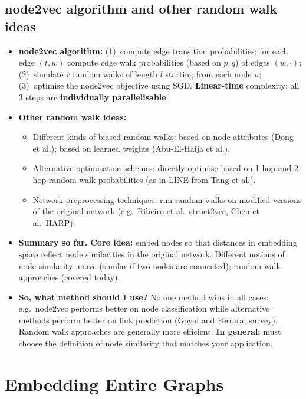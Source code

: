 \subsection{node2vec algorithm and other random walk ideas}\label{sec:lec02-n2v-alg}

\begin{itemize}
  \item \textbf{node2vec algorithm:}
    (1)~compute edge transition probabilities: for each edge $(t,w)$ compute edge
    walk probabilities (based on $p,q$) of edges $(w,\cdot)$;
    (2)~simulate $r$ random walks of length $l$ starting from each node $u$;
    (3)~optimise the node2vec objective using SGD.
    \textbf{Linear-time} complexity; all 3 steps are \textbf{individually
    parallelisable}.
  \item \textbf{Other random walk ideas:}
    \begin{itemize}
      \item Different kinds of biased random walks: based on node attributes
        (Dong et al.); based on learned weights (Abu-El-Haija et al.).
      \item Alternative optimisation schemes: directly optimise based on 1-hop and
        2-hop random walk probabilities (as in LINE from Tang et al.).
      \item Network preprocessing techniques: run random walks on modified
        versions of the original network (e.g.\ Ribeiro et al.\ struct2vec,
        Chen et al.\ HARP).
    \end{itemize}
  \item \textbf{Summary so far.} \textbf{Core idea:} embed nodes so that distances
    in embedding space reflect node similarities in the original network.
    Different notions of node similarity: na\"ive (similar if two nodes are
    connected); random walk approaches (covered today).
  \item \textbf{So, what method should I use?} No one method wins in all cases;
    e.g.\ node2vec performs better on node classification while alternative
    methods perform better on link prediction (Goyal and Ferrara, survey).
    Random walk approaches are generally more efficient. \textbf{In general:} must
    choose the definition of node similarity that matches your application.
\end{itemize}

\section{Embedding Entire Graphs}\label{sec:lec02-graphemb}

